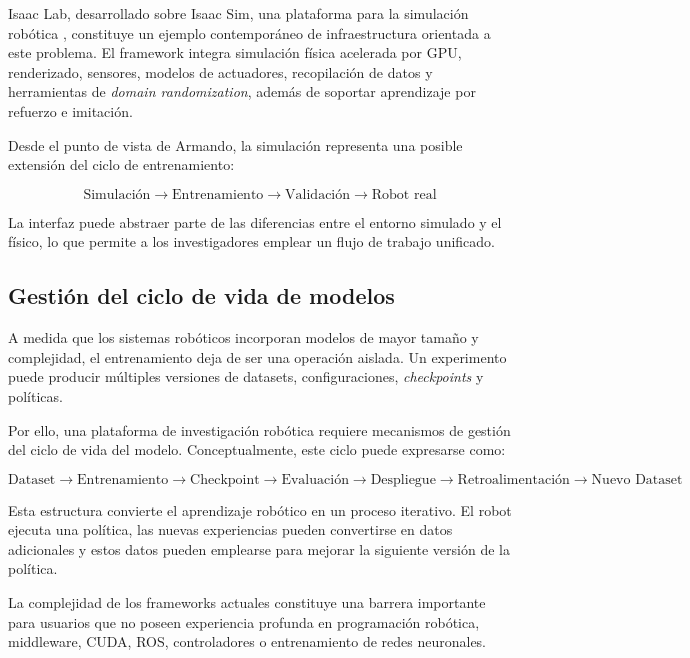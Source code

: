 \documentclass[stu,12pt,floatsintext]{apa7}
\begin{document}
Isaac Lab, desarrollado sobre Isaac Sim, una plataforma para la simulación robótica \parencite{gao2026nvidiaisaacsimenabling}, constituye un ejemplo contemporáneo de infraestructura orientada a este problema. El framework integra simulación física acelerada por GPU, renderizado, sensores, modelos de actuadores, recopilación de datos y herramientas de \textit{domain randomization}, además de soportar aprendizaje por refuerzo e imitación.

Desde el punto de vista de Armando, la simulación representa una posible extensión del ciclo de entrenamiento:

\begin{equation}
\text{Simulación}
\rightarrow
\text{Entrenamiento}
\rightarrow
\text{Validación}
\rightarrow
\text{Robot real}
\end{equation}

La interfaz puede abstraer parte de las diferencias entre el entorno simulado y el físico, lo que permite a los investigadores emplear un flujo de trabajo unificado.

\subsection{Gestión del ciclo de vida de modelos}

A medida que los sistemas robóticos incorporan modelos de mayor tamaño y complejidad, el entrenamiento deja de ser una operación aislada. Un experimento puede producir múltiples versiones de datasets, configuraciones, \textit{checkpoints} y políticas.

Por ello, una plataforma de investigación robótica requiere mecanismos de gestión del ciclo de vida del modelo. Conceptualmente, este ciclo puede expresarse como:

\begin{equation}
\text{Dataset}
\rightarrow
\text{Entrenamiento}
\rightarrow
\text{Checkpoint}
\rightarrow
\text{Evaluación}
\rightarrow
\text{Despliegue}
\rightarrow
\text{Retroalimentación}
\rightarrow
\text{Nuevo Dataset}
\end{equation}

Esta estructura convierte el aprendizaje robótico en un proceso iterativo. El robot ejecuta una política, las nuevas experiencias pueden convertirse en datos adicionales y estos datos pueden emplearse para mejorar la siguiente versión de la política.

La complejidad de los frameworks actuales constituye una barrera importante para usuarios que no poseen experiencia profunda en programación robótica, middleware, CUDA, ROS, controladores o entrenamiento de redes neuronales.
\end{document}
